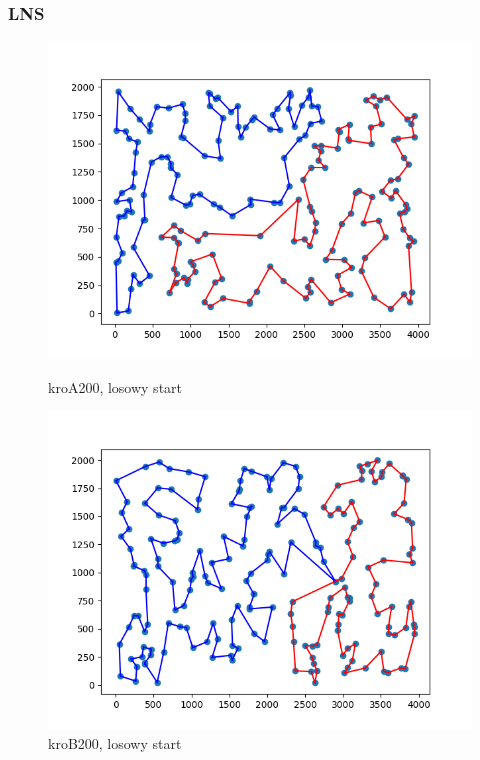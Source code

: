 \documentclass[11pt]{article}
\begin{document}
\subsubsection{LNS}

\begin{figure}[H]
    \begin{minipage}[t]{0.45\textwidth}
        \centering
        \includegraphics[width=\linewidth]{best_paths/kroA200/LNS}
        \caption{kroA200, losowy start}
    \end{minipage}
    \hfill
    \begin{minipage}[t]{0.45\textwidth}
        \centering
        \includegraphics[width=\linewidth]{best_paths/kroB200/LNS}
        \caption{kroB200, losowy start}
    \end{minipage}\label{fig:figure2}
\end{figure}
\end{document}
